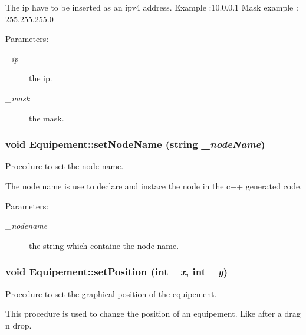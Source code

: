 The ip have to be inserted as an ipv4 address. Example :10.0.0.1 Mask example : 255.255.255.0

\begin{Desc}
\item[Parameters:]
\begin{description}
\item[{\em \_\-ip}]the ip. \item[{\em \_\-mask}]the mask. \end{description}
\end{Desc}
\hypertarget{class_equipement_8f83b540ca8ad94b6c70a1d135e66ba6}{
\subsubsection[{setNodeName}]{\setlength{\rightskip}{0pt plus 5cm}void Equipement::setNodeName (string {\em \_\-nodeName})}}
\label{class_equipement_8f83b540ca8ad94b6c70a1d135e66ba6}


Procedure to set the node name. 

The node name is use to declare and instace the node in the c++ generated code.

\begin{Desc}
\item[Parameters:]
\begin{description}
\item[{\em \_\-nodename}]the string which containe the node name. \end{description}
\end{Desc}
\hypertarget{class_equipement_70bc8e8f1b9527a9c54f4ac6bd93a2c7}{
\subsubsection[{setPosition}]{\setlength{\rightskip}{0pt plus 5cm}void Equipement::setPosition (int {\em \_\-x}, \/  int {\em \_\-y})}}
\label{class_equipement_70bc8e8f1b9527a9c54f4ac6bd93a2c7}


Procedure to set the graphical position of the equipement. 

This procedure is used to change the position of an equipement. Like after a drag n drop.

